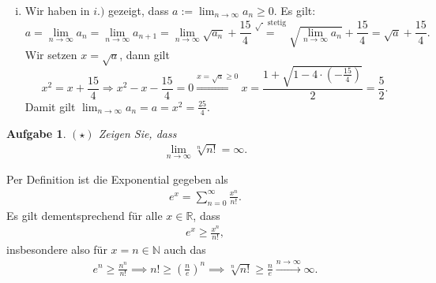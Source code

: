 \documentclass[a4paper, 20]{exam}
\newtheorem{ex}{Aufgabe}
\newcommand\NN{\mathbb{N}}
\begin{document}
\begin{solution}
\begin{enumerate}[i.)]
\begin{proof}
Damit haben wir gezeigt, dass $(1)$ immer erf\"ullt ist, d.h. $(a_k)_{k \in \NN}$ ist monoton wachsend. Weiter haben wir gezeigt, dass $0<a_k \leq 25/4$. Also ist $(a_k)_{k\in \NN}$ monoton und beschr\"ankt, also konvergent.
\end{proof}
\item
Wir haben in $i.)$ gezeigt, dass $a:=\lim_{n\rightarrow \infty} a_n\geq 0$. Es gilt:
$$ a =  \lim_{n\rightarrow \infty} a_n= \lim_{n\rightarrow \infty} a_{n+1}
= \lim_{n\rightarrow \infty} \sqrt{a_n} + \frac{15}{4}
\stackrel{\sqrt{\cdot} \text{ stetig}}{=} \sqrt{\lim_{n\rightarrow \infty} a_n} +\frac{15}{4}
= \sqrt{a} + \frac{15}{4}.$$
Wir setzen $x=\sqrt{a}$, dann gilt
$$ x^2= x + \frac{15}{4} \Longrightarrow x^2 -x - \frac{15}{4} = 0 
\stackrel{x= \sqrt{a}\geq 0}{\Longrightarrow} x = \frac{1+\sqrt{1-4\cdot (-\frac{15}{4})}}{2}= \frac{5}{2}.$$
Damit gilt $\lim_{n\rightarrow \infty} a_n = a = x^2=  \frac{25}{4}$.
\end{enumerate}
\end{solution}


\begin{ex}{$(\star)$} Zeigen Sie, dass 
\begin{align*}
\lim_{n \to \infty} \sqrt[n]{n!}= \infty.
\end{align*}
\end{ex}

\begin{solution} Per Definition ist die Exponential gegeben als 
\begin{align*}
e^x = \sum_{n=0}^\infty \frac{x^n}{n!}.
\end{align*}
Es gilt dementsprechend für alle $x \in \mathbb{R}$, dass
\begin{align*}
e^x \geq \frac{x^n}{n!},
\end{align*}
insbesondere also für $x=n \in \mathbb{N}$ auch das
\begin{align*}
e^n \geq \frac{n^n}{n!} \implies n! \geq \left( \frac{n}{e}\right)^n \implies \sqrt[n]{n!} \geq\frac{n}{e} \xrightarrow{n \to \infty} \infty.
\end{align*}
\end{solution}
\end{document}
